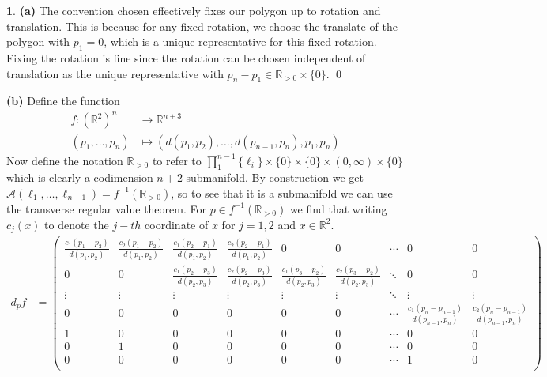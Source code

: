 \documentclass[10.5pt]{article}
\theoremstyle{definition}
\newtheorem{pb}{}
\newcommand{\set}[1]{\{#1\}}
\begin{document}
    \begin{pb}
        \textbf{(a)} The convention chosen effectively fixes our polygon up to rotation and translation. This is because for any fixed rotation, we choose the translate of the polygon with \(p_1 = 0\), which is a unique representative for this fixed rotation. Fixing the rotation is fine since the rotation can be chosen independent of translation as the unique representative with \(p_n - p_1 \in \mathbb{R}_{>0} \times \set{0}\). \qed

        \textbf{(b)} Define the function
        \begin{align*}
            f: (\mathbb{R}^2)^n &\to \mathbb{R}^{n+3} \\
            (p_1,\hdots,p_n) &\mapsto (d(p_1,p_2),\hdots,d(p_{n-1},p_n),p_1,p_n)
        \end{align*}
        Now define the notation \(\mathbb{R}_{>0}\) to refer to \(\prod_1^{n-1}\set{\ell_i} \times \set{0} \times \set{0} \times (0,\infty) \times \set{0}\) which is clearly a codimension \(n+2\) submanifold. By construction we get \(\mathcal{A}(\ell_1,\hdots,\ell_{n-1}) = f^{-1}(\mathbb{R}_{>0})\), so to see that it is a submanifold we can use the transverse regular value theorem. For \(p \in f^{-1}(\mathbb{R}_{>0})\) we find that writing \(c_j(x)\) to denote the \(j-th\) coordinate of \(x\) for \(j = 1,2\) and \(x \in \mathbb{R}^2\).
        \begin{align*}
            d_pf &= \begin{pmatrix}
                \frac{c_1(p_1 - p_2)}{d(p_1,p_2)} & \frac{c_2(p_1 - p_2)}{d(p_1,p_2)} & \frac{c_1(p_2 - p_1)}{d(p_1,p_2)} & \frac{c_2(p_2 - p_1)}{d(p_1,p_2)} & 0 & 0 & \cdots & 0 & 0 \\
                0 & 0 & \frac{c_1(p_2 - p_3)}{d(p_2,p_3)} & \frac{c_2(p_2 - p_3)}{d(p_2,p_3)} & \frac{c_1(p_3 - p_2)}{d(p_2,p_3)} & \frac{c_2(p_3 - p_2)}{d(p_2,p_3)} & \ddots &  0 & 0\\
                \vdots  & \vdots & \vdots & \vdots & \vdots & \vdots & \ddots  & \vdots & \vdots\\
                0 & 0 & 0 & 0 & 0 & 0 & \cdots & \frac{c_1(p_n - p_{n-1})}{d(p_{n-1},p_n)} & \frac{c_2(p_n - p_{n-1})}{d(p_{n-1},p_n)}\\
                1 & 0 & 0 & 0 & 0 & 0 & \cdots & 0 & 0\\
                0 & 1 & 0 & 0& 0& 0 &\cdots &0 & 0\\
                0 & 0 & 0 & 0 & 0 & 0 & \cdots & 1 & 0 \\

\end{pmatrix}
\end{align*}
\end{pb}
\end{document}
